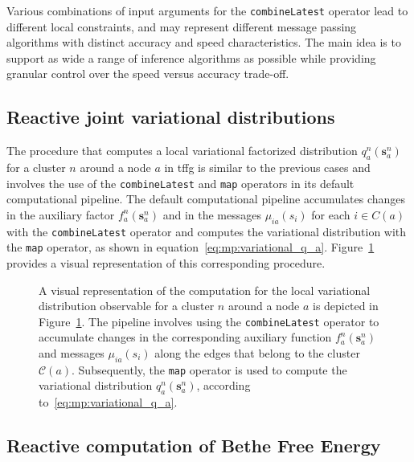 Various combinations of input arguments for the \texttt{combineLatest} operator
lead to different local constraints, and may represent different message
passing algorithms with distinct accuracy and speed characteristics.
The main idea is to support as wide a range of inference algorithms as possible while
providing granular control over the speed versus accuracy trade-off.

\subsection{Reactive joint variational distributions}

The procedure that computes a local variational factorized distribution $q^n_a(\bm{s}^n_a)$
for a cluster $n$ around a node $a$ in \ac{tffg} is similar to the previous cases and involves the
use of the \texttt{combineLatest} and \texttt{map} operators in its default computational
pipeline.
The default computational pipeline accumulates changes in the auxiliary factor
$f^n_a(\bm{s}^n_a)$ and in the messages $\mu_{ia}(s_i)$ for each $i \in C(a)$ with the
\texttt{combineLatest} operator and computes the variational distribution with the
\texttt{map} operator, as shown in equation~\eqref{eq:mp:variational_q_a}.
Figure~\ref{fig:rmp:reactive_cluster} provides a visual representation of this corresponding
procedure.

\begin{figure}
  \centering
  \resizebox{0.8\textwidth}{!}{}
  \caption{
    A visual representation of the computation for the local variational distribution observable for a cluster $n$ around a node $a$ is depicted in Figure~\ref{fig:rmp:reactive_cluster}.
    The pipeline involves using the \texttt{combineLatest} operator to accumulate changes in the
    corresponding auxiliary function $f^n_a(\bm{s}^n_a)$ and messages $\mu_{ia}(s_i)$ along the
    edges that belong to the cluster $\mathcal{C}(a)$.
    Subsequently, the \texttt{map} operator is used to compute the variational distribution
    $q^n_a(\bm{s}^n_a)$, according to~\eqref{eq:mp:variational_q_a}.
  }
  \label{fig:rmp:reactive_cluster}
\end{figure}

\subsection{Reactive computation of Bethe Free Energy}

